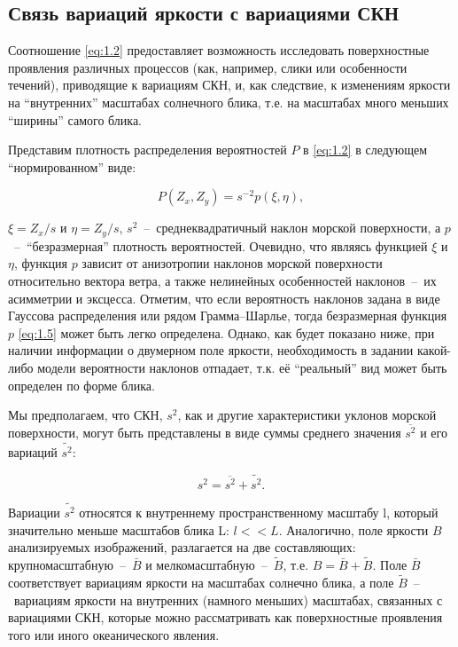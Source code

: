 \subsection{Связь вариаций яркости с вариациями СКН} \label{sec:1.3.2}



Соотношение \eqref{eq:1.2} предоставляет возможность исследовать поверхностные проявления различных процессов (как, например, слики или особенности течений), приводящие к вариациям СКН, и, как следствие, к изменениям яркости на ``внутренних'' масштабах солнечного блика, т.е. на масштабах много меньших ``ширины'' самого блика.

Представим плотность распределения вероятностей $P$ в \eqref{eq:1.2} в следующем ``нормированном'' виде:


\begin{equation} \label{eq:1.5} 
    P(Z_{x} ,Z_{y} )=s^{-2} p(\xi ,\eta ), 
\end{equation} 


 $\xi =Z_{x} /s$ и $\eta =Z_{y} /s$, $s^{2} $~--~среднеквадратичный наклон морской поверхности, а $p$~--~``безразмерная'' плотность вероятностей. Очевидно, что являясь функцией $\xi $ и $\eta $, функция $p$ зависит от анизотропии наклонов морской поверхности относительно вектора ветра, а также нелинейных особенностей наклонов~--~их асимметрии и эксцесса. Отметим, что если вероятность наклонов задана в виде Гауссова распределения или рядом Грамма--Шарлье, тогда безразмерная функция $p$ \eqref{eq:1.5} может быть легко определена. Однако, как будет показано ниже, при наличии информации о двумерном поле яркости, необходимость в задании какой-либо модели вероятности наклонов отпадает, т.к. её ``реальный'' вид может быть определен по форме блика. 

Мы предполагаем, что СКН, $s^{2} $, как и другие характеристики уклонов морской поверхности, могут быть представлены в виде суммы среднего значения $\overline{s^{2} }$ и его вариаций $\widetilde{s^{2} }$:


\begin{equation} \label{eq:1.6}
    s^{2} =\overline{s^{2} }+\widetilde{s^{2} }.
\end{equation}


Вариации $\widetilde{s^{2} }$ относятся к внутреннему пространственному масштабу l, который значительно меньше масштабов блика L: $l<<L$. Аналогично, поле яркости $B$ анализируемых изображений, разлагается на две составляющих: крупномасштабную~--~$\bar{B}$ и мелкомасштабную~--~$\tilde{B}$, т.е. $B=\bar{B}+\tilde{B}$. Поле $\bar{B}$ соответствует вариациям яркости на масштабах солнечно блика, а поле $\tilde{B}$~--~вариациям яркости на внутренних (намного меньших) масштабах, связанных с вариациями СКН, которые можно рассматривать как поверхностные проявления того или иного океанического явления.


